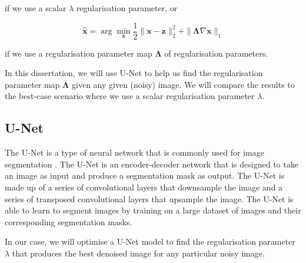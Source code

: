 \documentclass[12pt]{article}
\begin{document}
if we use a scalar $\lambda$ regularisation parameter, or

\begin{equation} \label{eq:1}
  \hat{\mathbf{x}} = \arg \min_{\mathbf{x}} \frac{1}{2} \|\mathbf{x} - \mathbf{z}\|_2^2 + \| \mathbf{\Lambda} \nabla \mathbf{x} \|_1
\end{equation}

if we use a regularisation parameter map $\mathbf{\Lambda}$ of regularisation parameters.

In this dissertation, we will use
U-Net to help us find the regularisation parameter map $\mathbf{\Lambda}$ 
given any given (noisy) image. 
We will compare the results to the best-case scenario where we use a scalar regularisation parameter $\lambda$.






\subsection{U-Net}

The U-Net is a type of neural network that is commonly used for image segmentation \cite{ronneberger2015unet}.
The U-Net is an encoder-decoder network that is designed to take an image as input and produce a segmentation mask as output.
The U-Net is made up of a series of convolutional layers that downsample the image and a series of transposed convolutional layers that upsample the image.
The U-Net is able to learn to segment images by training on a large dataset of images and their corresponding segmentation masks.

In our case, we will optimise a U-Net model to find the regularisation parameter $\lambda$ that produces the best denoised image for any particular noisy image.
\end{document}
